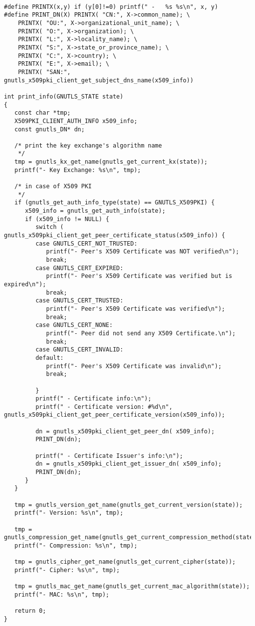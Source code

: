 \begin{verbatim}

#define PRINTX(x,y) if (y[0]!=0) printf(" -   %s %s\n", x, y)
#define PRINT_DN(X) PRINTX( "CN:", X->common_name); \
	PRINTX( "OU:", X->organizational_unit_name); \
	PRINTX( "O:", X->organization); \
	PRINTX( "L:", X->locality_name); \
	PRINTX( "S:", X->state_or_province_name); \
	PRINTX( "C:", X->country); \
	PRINTX( "E:", X->email); \
	PRINTX( "SAN:", gnutls_x509pki_client_get_subject_dns_name(x509_info))

int print_info(GNUTLS_STATE state)
{
   const char *tmp;
   X509PKI_CLIENT_AUTH_INFO x509_info;
   const gnutls_DN* dn;

   /* print the key exchange's algorithm name
    */
   tmp = gnutls_kx_get_name(gnutls_get_current_kx(state));
   printf("- Key Exchange: %s\n", tmp);

   /* in case of X509 PKI
    */
   if (gnutls_get_auth_info_type(state) == GNUTLS_X509PKI) {
      x509_info = gnutls_get_auth_info(state);
      if (x509_info != NULL) {
         switch ( gnutls_x509pki_client_get_peer_certificate_status(x509_info)) {
         case GNUTLS_CERT_NOT_TRUSTED:
            printf("- Peer's X509 Certificate was NOT verified\n");
            break;
         case GNUTLS_CERT_EXPIRED:
            printf("- Peer's X509 Certificate was verified but is expired\n");
            break;
         case GNUTLS_CERT_TRUSTED:
            printf("- Peer's X509 Certificate was verified\n");
            break;
         case GNUTLS_CERT_NONE:
            printf("- Peer did not send any X509 Certificate.\n");
            break;
         case GNUTLS_CERT_INVALID:
         default:
            printf("- Peer's X509 Certificate was invalid\n");
            break;

         }
         printf(" - Certificate info:\n");
         printf(" - Certificate version: #%d\n", gnutls_x509pki_client_get_peer_certificate_version(x509_info));

         dn = gnutls_x509pki_client_get_peer_dn( x509_info);
         PRINT_DN(dn);

         printf(" - Certificate Issuer's info:\n");
         dn = gnutls_x509pki_client_get_issuer_dn( x509_info);
         PRINT_DN(dn);
      }
   }

   tmp = gnutls_version_get_name(gnutls_get_current_version(state));
   printf("- Version: %s\n", tmp);

   tmp = gnutls_compression_get_name(gnutls_get_current_compression_method(state));
   printf("- Compression: %s\n", tmp);

   tmp = gnutls_cipher_get_name(gnutls_get_current_cipher(state));
   printf("- Cipher: %s\n", tmp);

   tmp = gnutls_mac_get_name(gnutls_get_current_mac_algorithm(state));
   printf("- MAC: %s\n", tmp);

   return 0;
}

\end{verbatim}
